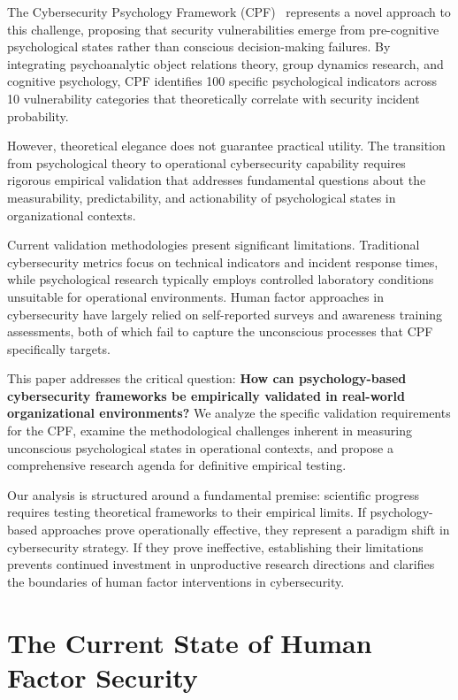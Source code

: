 \documentclass[11pt,a4paper]{article}
\begin{document}
The Cybersecurity Psychology Framework (CPF)~\cite{canale2025} represents a novel approach to this challenge, proposing that security vulnerabilities emerge from pre-cognitive psychological states rather than conscious decision-making failures. By integrating psychoanalytic object relations theory, group dynamics research, and cognitive psychology, CPF identifies 100 specific psychological indicators across 10 vulnerability categories that theoretically correlate with security incident probability.

However, theoretical elegance does not guarantee practical utility. The transition from psychological theory to operational cybersecurity capability requires rigorous empirical validation that addresses fundamental questions about the measurability, predictability, and actionability of psychological states in organizational contexts.

Current validation methodologies present significant limitations. Traditional cybersecurity metrics focus on technical indicators and incident response times, while psychological research typically employs controlled laboratory conditions unsuitable for operational environments. Human factor approaches in cybersecurity have largely relied on self-reported surveys and awareness training assessments, both of which fail to capture the unconscious processes that CPF specifically targets.

This paper addresses the critical question: \textbf{How can psychology-based cybersecurity frameworks be empirically validated in real-world organizational environments?} We analyze the specific validation requirements for the CPF, examine the methodological challenges inherent in measuring unconscious psychological states in operational contexts, and propose a comprehensive research agenda for definitive empirical testing.

Our analysis is structured around a fundamental premise: scientific progress requires testing theoretical frameworks to their empirical limits. If psychology-based approaches prove operationally effective, they represent a paradigm shift in cybersecurity strategy. If they prove ineffective, establishing their limitations prevents continued investment in unproductive research directions and clarifies the boundaries of human factor interventions in cybersecurity.

\section{The Current State of Human Factor Security}
\end{document}
